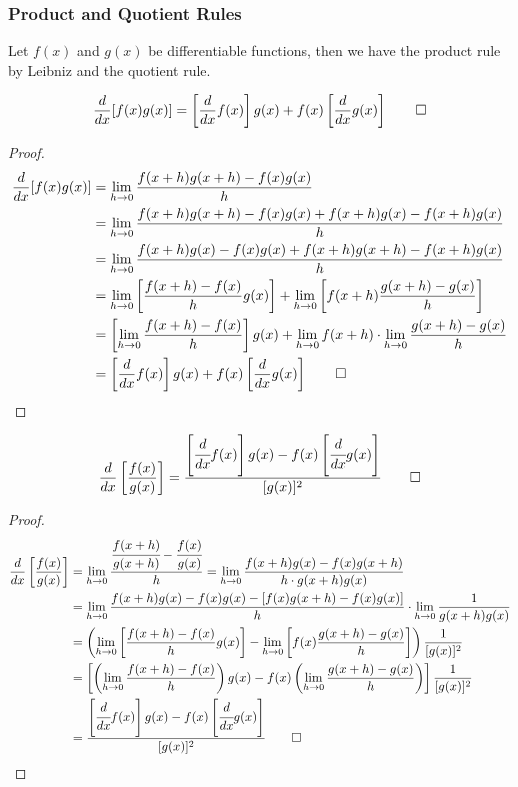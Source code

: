 \subsubsection{Product and Quotient Rules}
Let \(f(x)\) and \(g(x)\) be differentiable functions, then we have the
product rule by Leibniz and the quotient rule.
\begin{theorem}
    \[\frac{d}{dx}[f(x)g(x)]=\left[\frac{d}{dx}f(x)\right]g(x)
    +f(x)\left[\frac{d}{dx}g(x)\right]\qedhere\]
\end{theorem}
\begin{proof}
    \begin{align*}
        \frac{d}{dx}[f(x)g(x)]
        &= \lim_{h\to 0}\frac{f(x+h)g(x+h)-f(x)g(x)}{h} \\
        &= \lim_{h\to 0}\frac{f(x+h)g(x+h)-f(x)g(x)+f(x+h)g(x)-f(x+h)g(x)}{h} \\
        &= \lim_{h\to 0}\frac{f(x+h)g(x)-f(x)g(x)+f(x+h)g(x+h)-f(x+h)g(x)}{h} \\
        &= \lim_{h\to 0}\left[\frac{f(x+h)-f(x)}{h}g(x)\right]
        +\lim_{h\to 0}\left[f(x+h)\frac{g(x+h)-g(x)}{h}\right] \\
        &= \left[\lim_{h\to 0}\frac{f(x+h)-f(x)}{h}\right]g(x)
        +\lim_{h\to 0}f(x+h)\cdot\lim_{h\to 0}\frac{g(x+h)-g(x)}{h} \\
        &= \left[\frac{d}{dx}f(x)\right]g(x)
        +f(x)\left[\frac{d}{dx}g(x)\right]\qedhere
    \end{align*}
\end{proof}
\begin{theorem}
    \[\frac{d}{dx}\left[\frac{f(x)}{g(x)}\right]
    =\frac{\left[\cfrac{d}{dx}f(x)\right]g(x)
    -f(x)\left[\cfrac{d}{dx}g(x)\right]}{[g(x)]^2}\qedhere\]
\end{theorem}
\begin{proof}
    \begin{align*}
        \frac{d}{dx}\left[\frac{f(x)}{g(x)}\right]
        &= \lim_{h\to 0}\frac{\cfrac{f(x+h)}{g(x+h)}-\cfrac{f(x)}{g(x)}}{h}
        =\lim_{h\to 0}\frac{f(x+h)g(x)-f(x)g(x+h)}{h\cdot g(x+h)g(x)} \\
        &= \lim_{h\to 0}\frac{f(x+h)g(x)-f(x)g(x)-[f(x)g(x+h)-f(x)g(x)]}{h}
        \cdot\lim_{h\to 0}\frac{1}{g(x+h)g(x)} \\
        &= \left(\lim_{h\to 0}\left[\frac{f(x+h)-f(x)}{h}g(x)\right]
        -\lim_{h\to 0}\left[f(x)\frac{g(x+h)-g(x)}{h}\right]\right)
        \frac{1}{[g(x)]^2} \\
        &= \left[\left(\lim_{h\to 0}\frac{f(x+h)-f(x)}{h}\right)g(x)
        -f(x)\left(\lim_{h\to 0}\frac{g(x+h)-g(x)}{h}\right)\right]
        \frac{1}{[g(x)]^2} \\
        &= \frac{\left[\cfrac{d}{dx}f(x)\right]g(x)
        -f(x)\left[\cfrac{d}{dx}g(x)\right]}{[g(x)]^2}\qedhere
    \end{align*}
\end{proof}

